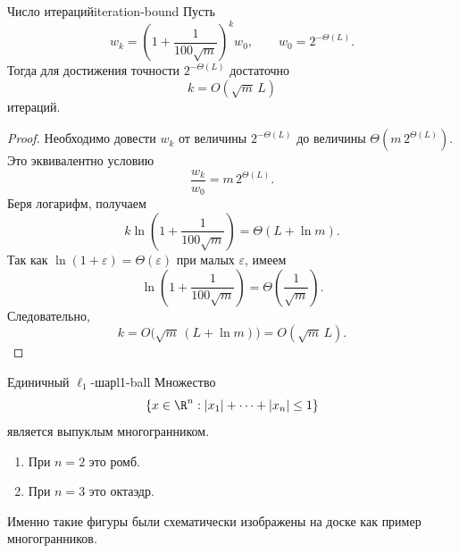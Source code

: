 \begin{Proposition}{Число итераций}{iteration-bound}
	Пусть
	\[
	w_k = \left(1 + \frac{1}{100\sqrt m}\right)^k w_0,
	\qquad
	w_0 = 2^{-\Theta(L)}.
	\]
	Тогда для достижения точности \(2^{-\Theta(L)}\) достаточно
	\[
	k = O(\sqrt m\, L)
	\]
	итераций.
\end{Proposition}

\begin{proof}
	Необходимо довести \(w_k\) от величины \(2^{-\Theta(L)}\) до величины \(\Theta(m\,2^{\Theta(L)})\).
	Это эквивалентно условию
	\[
	\frac{w_k}{w_0} = m\, 2^{\Theta(L)}.
	\]
	Беря логарифм, получаем
	\[
	k \ln\!\left(1+\frac{1}{100\sqrt m}\right) = \Theta(L+\ln m).
	\]
	Так как \(\ln(1+\varepsilon)=\Theta(\varepsilon)\) при малых \(\varepsilon\), имеем
	\[
	\ln\!\left(1+\frac{1}{100\sqrt m}\right)=\Theta\!\left(\frac{1}{\sqrt m}\right).
	\]
	Следовательно,
	\[
	k = O\!\bigl(\sqrt m \, (L+\ln m)\bigr)=O(\sqrt m\,L).
	\]
\end{proof}

\begin{Example}{Единичный \(\ell_1\)-шар}{l1-ball}
	Множество
	\[
	\left\{
	x \in \R^n :
	|x_1|+\dots+|x_n| \le 1
	\right\}
	\]
	является выпуклым многогранником.
	
	\begin{enumerate}
		\item При \(n=2\) это ромб.
		\item При \(n=3\) это октаэдр.
	\end{enumerate}
	
	Именно такие фигуры были схематически изображены на доске как пример многогранников.
\end{Example}
